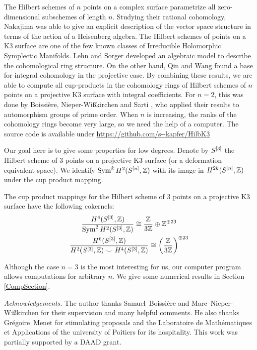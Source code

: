 
The Hilbert schemes of $n$ points on a complex surface parametrize all zero-dimensional subschemes of length $n$. Studying their rational cohomology, Nakajima \cite{Nakajima} was able to give an explicit description of the vector space structure in terms of the action of a Heisenberg algebra.
The Hilbert schemes of points on a K3 surface are one of the few known classes of Irreducible Holomorphic Symplectic Manifolds. Lehn and Sorger \cite{LehnSorger} developed an algebraic model to describe the cohomological ring structure. On the other hand, Qin and Wang \cite{QinWang} found a base for integral cohomology in the projective case. By combining these results, we are able to compute all cup-products in the cohomology rings of Hilbert schemes of $n$ points on a projective K3 surface with integral coefficients. 
For $n=2$, this was done by Boissi\`ere, Nieper-Wi{\ss}kirchen and Sarti \cite{BNS}, who applied their results to automorphism groups of prime order. When $n$ is increasing, the ranks of the cohomology rings become very large, so we need the help of a computer. The source code is available under \url{https://github.com/s--kapfer/HilbK3}

Our goal here is to give some properties for low degrees.
Denote by $S^{[3]}$ the Hilbert scheme of 3 points on a projective K3 surface (or a deformation equivalent space). We identify $\operatorname{Sym}^kH^2(S^{[n]},\mathbb{Z})$ with its image in $H^{2k}(S^{[n]},\mathbb{Z})$ under the cup product mapping. 
\begin{theorem}
The cup product mappings for the Hilbert scheme of 3 points on a projective K3 surface have the following cokernels:
\begin{gather}
\frac{H^4(S^{[3]},\mathbb{Z})}{\operatorname{Sym}^2 H^2(S^{[3]},\mathbb{Z})}  \cong \frac{\mathbb{Z}}{3\mathbb{Z}} \oplus \mathbb{Z}^ {\oplus 23}\\
\frac{H^6(S^{[3]},\mathbb{Z})}{H^2(S^{[3]},\mathbb{Z})\smile H^4(S^{[3]},\mathbb{Z})} \cong \left(\frac{\mathbb{Z}}{3\mathbb{Z}}\right)^{\oplus 23}
\end{gather}
\end{theorem}
Although the case $n=3$ is the most interesting for us, our computer program allows computations for arbitrary $n$. We give some numerical results in Section \ref{CompSection}.\vspace{5pt}

\emph{Acknowledgements.} The author thanks Samuel~Boissi\`ere and Marc~Nieper-Wi{\ss}kirchen for their supervision and many helpful comments. He also thanks Gr\'{e}goire~Menet for stimulating proposals and the Laboratoire de Math\'{e}matiques et Applications of the university of Poitiers for its hospitality. This work was partially supported by a DAAD grant.

